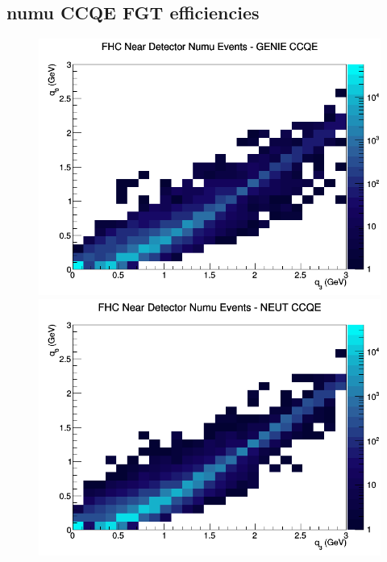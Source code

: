 \subsection{numu CCQE FGT efficiencies}
\begin{figure}[h]
\includegraphics[width=\linewidth]{eff_q0_q3/FGT/CCQE_FHC_ND_numu_q3_q0_GENIE.png}
\endminipage
{}
\includegraphics[width=\linewidth]{eff_q0_q3/FGT/CCQE_FHC_ND_numu_q3_q0_NEUT.png}
\endminipage
{}

\end{figure}
